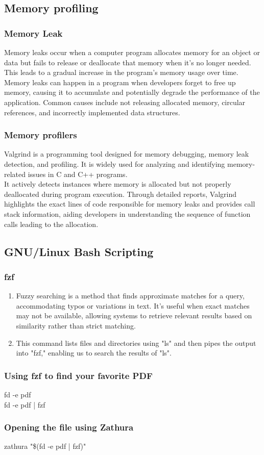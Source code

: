 \documentclass[titlepage]{article}
\begin{document}
\subsection{Memory profiling}
\subsubsection{Memory Leak}
Memory leaks occur when a computer program allocates memory for an object or data but fails to release or deallocate that memory when it's no longer needed. This leads to a gradual increase in the program's memory usage over time. Memory leaks can happen in a program when developers forget to free up memory, causing it to accumulate and potentially degrade the performance of the application. Common causes include not releasing allocated memory, circular references, and incorrectly implemented data structures.
\subsubsection{Memory profilers}
Valgrind is a programming tool designed for memory debugging, memory leak detection, and profiling. It is widely used for analyzing and identifying memory-related issues in C and C++ programs.\\
It actively detects instances where memory is allocated but not properly deallocated during program execution. Through detailed reports, Valgrind highlights the exact lines of code responsible for memory leaks and provides call stack information, aiding developers in understanding the sequence of function calls leading to the allocation.
\subsection{GNU/Linux Bash Scripting}
\subsubsection{fzf}
\begin{enumerate}
\item 
Fuzzy searching is a method that finds approximate matches for a query, accommodating typos or variations in text. It's useful when exact matches may not be available, allowing systems to retrieve relevant results based on similarity rather than strict matching.
\item This command lists files and directories using "ls" and then pipes the output into "fzf," enabling us to search the results of "ls".

\end{enumerate}
\subsubsection{Using fzf to find your favorite PDF}
fd -e pdf\\
fd -e pdf | fzf
\subsubsection{Opening the file using Zathura}
zathura "\$(fd -e pdf | fzf)"
\end{document}
